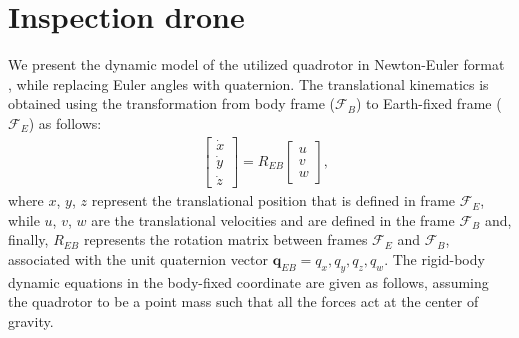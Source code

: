 \documentclass[letterpaper, 10 pt, conference]{ieeeconf}  %
\begin{document}
\section{Inspection drone}\label{sec:robot}
We present the dynamic model of the utilized quadrotor in Newton-Euler format \cite{deepmodel_mohit}, while replacing Euler angles with quaternion. The translational kinematics is obtained using the transformation from body frame ($\mathcal{F}_B$) to Earth-fixed frame ($\mathcal{F}_E$) as follows:
%
\begin{align} \label{eq:kin_tilt}
	& \left[ \begin{array}{c} \dot{x} \\ \dot{y} \\ \dot{z} \end{array} \right] = R_{EB} \left[ \begin{array}{c} u \\ v \\ w \end{array} \right],
\end{align}
%
where $x$, $y$, $z$ represent the translational position that is defined in frame $\mathcal{F}_E$, while $u$, $v$, $w$ are the translational velocities and are defined in the frame $\mathcal{F}_B$ and, finally, $R_{EB}$ represents the rotation matrix between frames $\mathcal{F}_E$ and $\mathcal{F}_B$, %
%
%
associated with the unit quaternion vector $\mathbf{q}_{EB}=q_x, q_y, q_z, q_w$. The rigid-body dynamic equations in the body-fixed coordinate are given as follows, assuming the quadrotor to be a point mass such that all the forces act at the center of gravity.
\end{document}
